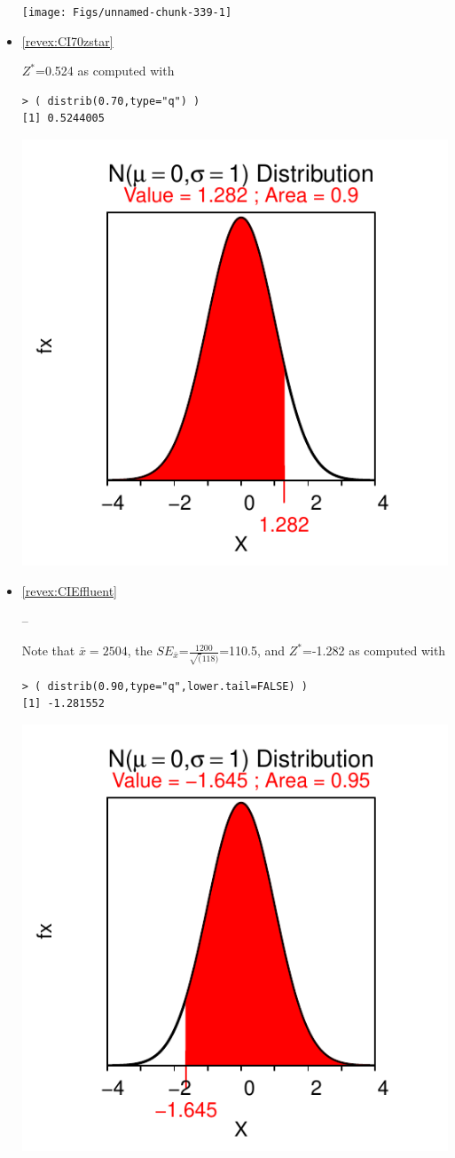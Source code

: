 \documentclass[10pt,openany]{book}\usepackage[]{graphicx}\usepackage[]{color}
\makeatletter
\newenvironment{kframe}{%
 \def\at@end@of@kframe{}%
 \ifinner\ifhmode%
  \def\at@end@of@kframe{\end{minipage}}%
  \begin{minipage}{\columnwidth}%
 \fi\fi%
 \def\FrameCommand##1{\hskip\@totalleftmargin \hskip-\fboxsep
 \colorbox{shadecolor}{##1}\hskip-\fboxsep
     \hskip-\linewidth \hskip-\@totalleftmargin \hskip\columnwidth}%
 \MakeFramed {\advance\hsize-\width
   \@totalleftmargin\z@ \linewidth\hsize
   \@setminipage}}%
 {\par\unskip\endMakeFramed%
 \at@end@of@kframe}
\newenvironment{knitrout}{}{} %
\makeatother
\begin{document}
\begin{itemize}
\begin{knitrout}
{\centering \texttt{[image: Figs/unnamed-chunk-339-1]} 

}



\end{knitrout}
  \item \hypertarget{ans:CI70zstar}{\ref{revex:CI70zstar}} $Z^{*}$=0.524 as computed with
\begin{knitrout}
\color{fgcolor}\begin{kframe}
\begin{verbatim}
> ( distrib(0.70,type="q") )
[1] 0.5244005
\end{verbatim}
\end{kframe}

{\centering \includegraphics[width=.4\linewidth]{Figs/unnamed-chunk-340-1} 

}



\end{knitrout}
  \item \hypertarget{ans:CIEffluent}{\ref{revex:CIEffluent}} --

Note that $\bar{x}=2504$, the $SE_{\bar{x}}$=$\frac{1200}{\sqrt(118)}$=110.5, and $Z^{*}$=-1.282 as computed with
\begin{knitrout}
\color{fgcolor}\begin{kframe}
\begin{verbatim}
> ( distrib(0.90,type="q",lower.tail=FALSE) )
[1] -1.281552
\end{verbatim}
\end{kframe}

{\centering \includegraphics[width=.4\linewidth]{Figs/unnamed-chunk-342-1} 

}
\end{knitrout}
\end{itemize}
\end{document}
